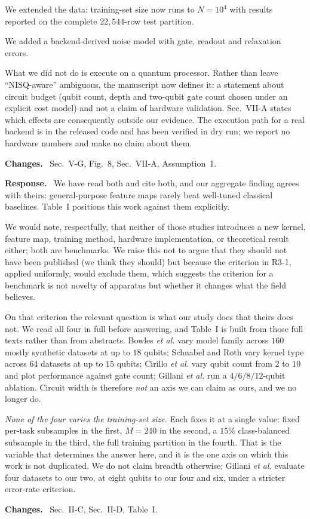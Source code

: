 \documentclass[11pt,a4paper]{article}
\newcommand{\itemhead}[2]{%
  \par\addvspace{15pt}%
  \noindent{\bfseries\color{tagink}#1}\hspace{0.7em}{\bfseries #2}%
  \par\addvspace{3.5pt}%
  \noindent{\color{rulegray}\rule{\linewidth}{0.5pt}}%
  \par\addvspace{5pt}%
  \nobreak}
\newcommand{\resp}{\par\addvspace{2pt}\noindent\textbf{Response.}\ }
\newcommand{\changed}{\par\addvspace{5pt}\noindent
  {\bfseries\color{tagink}Changes.}\ }
\begin{document}
We extended the data: training-set size now runs to $N=10^{4}$ with results
reported on the complete $22{,}544$-row test partition.

We added a backend-derived noise model with gate, readout and relaxation errors.

What we did not do is execute on a quantum processor. Rather than leave
``NISQ-aware'' ambiguous, the manuscript now defines it: a statement about
circuit budget (qubit count, depth and two-qubit gate count chosen under an
explicit cost model) and not a claim of hardware validation. Sec.~VII-A states
which effects are consequently outside our evidence. The execution path for a
real backend is in the released code and has been verified in dry run; we report
no hardware numbers and make no claim about them.
\changed
Sec.~V-G, Fig.~8, Sec.~VII-A, Assumption~1.

\itemhead{R3-5}{Results are already established in prior benchmarking studies
(arXiv:2403.07059, arXiv:2409.04406)}
\resp
We have read both and cite both, and our aggregate finding agrees with theirs:
general-purpose feature maps rarely beat well-tuned classical baselines. Table~I
positions this work against them explicitly.

We would note, respectfully, that neither of those studies introduces a new
kernel, feature map, training method, hardware implementation, or theoretical
result either; both are benchmarks. We raise this not to argue that they should
not have been published (we think they should) but because the criterion in
R3-1, applied uniformly, would exclude them, which suggests the criterion for a
benchmark is not novelty of apparatus but whether it changes what the field
believes.

On that criterion the relevant question is what our study does that theirs does
not. We read all four in full before answering, and Table~I is built from those
full texts rather than from abstracts. Bowles \emph{et al.} vary model family
across $160$ mostly synthetic datasets at up to $18$ qubits; Schnabel and Roth
vary kernel type across $64$ datasets at up to $15$ qubits; Cirillo \emph{et al.}
vary qubit count from $2$ to $10$ and plot performance against gate count;
Gillani \emph{et al.} run a $4/6/8/12$-qubit ablation. Circuit width is
therefore \emph{not} an axis we can claim as ours, and we no longer do.

\emph{None of the four varies the training-set size.} Each fixes it at a single
value: fixed per-task subsamples in the first, $M=240$ in the second, a $15\%$
class-balanced subsample in the third, the full training partition in the
fourth. That is the variable that determines the answer here, and it is the one
axis on which this work is not duplicated. We do not claim breadth otherwise;
Gillani \emph{et al.} evaluate four datasets to our two, at eight qubits to our
four and six, under a stricter error-rate criterion.
\changed
Sec.~II-C, Sec.~II-D, Table~I.
\end{document}
